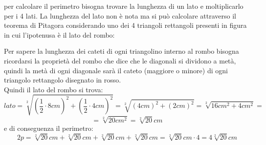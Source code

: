 \documentclass[14pt]{extarticle}
\begin{document}
per calcolare il perimetro bisogna trovare la lunghezza di un lato e moltiplicarlo per i 4 lati. La lunghezza del lato non è nota ma si può calcolare attraverso il teorema di Pitagora considerando uno dei 4 triangoli rettangoli presenti in figura in cui l'ipotenusa è il lato del rombo:\\
\hspace{0.5cm}

Per sapere la lunghezza dei cateti di ogni triangolino interno al rombo bisogna ricordarsi la proprietà del rombo che dice che le diagonali si dividono a metà, quindi la metà di ogni diagonale sarà il cateto (maggiore o minore) di ogni triangolo rettangolo disegnato in rosso.\\
Quindi il lato del rombo si trova:\\
\[lato=\sqrt[2]{(\dfrac{1}{2}\cdot8cm)^2+(\dfrac{1}{2}\cdot4cm)^2}=\sqrt[2]{(4cm)^2+(2cm)^2}=\sqrt[2]{16cm^2+4cm^2}=\]
\[=\sqrt[2]{20cm^2}=\sqrt[2]{20}cm\]
e di conseguenza il perimetro:
\[2p=\sqrt[2]{20}cm+\sqrt[2]{20}cm+\sqrt[2]{20}cm+\sqrt[2]{20}cm=\sqrt[2]{20}cm\cdot 4=4\sqrt[2]{20}cm\]
\end{document}
